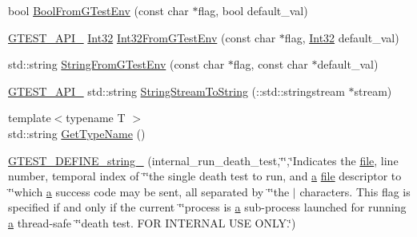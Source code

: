 \begin{DoxyCompactItemize}
\item 
bool \hyperlink{namespacetesting_1_1internal_a67132cdce23fb71b6c38ee34ef81eb4c}{Bool\+From\+G\+Test\+Env} (const char $\ast$flag, bool default\+\_\+val)
\item 
\hyperlink{gtest-port_8h_aa73be6f0ba4a7456180a94904ce17790}{G\+T\+E\+S\+T\+\_\+\+A\+P\+I\+\_\+} \hyperlink{namespacetesting_1_1internal_a8ee38faaf875f133358abaf9bc056cec}{Int32} \hyperlink{namespacetesting_1_1internal_a0f7e728793f9e6cb0aa2b69eaa468bf3}{Int32\+From\+G\+Test\+Env} (const char $\ast$flag, \hyperlink{namespacetesting_1_1internal_a8ee38faaf875f133358abaf9bc056cec}{Int32} default\+\_\+val)
\item 
std\+::string \hyperlink{namespacetesting_1_1internal_ac54dabc540bf79c2de91add679bfb93b}{String\+From\+G\+Test\+Env} (const char $\ast$flag, const char $\ast$default\+\_\+val)
\item 
\hyperlink{gtest-port_8h_aa73be6f0ba4a7456180a94904ce17790}{G\+T\+E\+S\+T\+\_\+\+A\+P\+I\+\_\+} std\+::string \hyperlink{namespacetesting_1_1internal_ac0a2b7f69fc829d80a39e925b6417e39}{String\+Stream\+To\+String} (\+::std\+::stringstream $\ast$stream)
\item 
{\footnotesize template$<$typename T $>$ }\\std\+::string \hyperlink{namespacetesting_1_1internal_a635606b4731f843c86ec8ca51cab83a1}{Get\+Type\+Name} ()
\item 
\hyperlink{namespacetesting_1_1internal_a1b4d550272b7346726a5b4976d5c7aca}{G\+T\+E\+S\+T\+\_\+\+D\+E\+F\+I\+N\+E\+\_\+string\+\_\+} (internal\+\_\+run\+\_\+death\+\_\+test,\char`\"{}\char`\"{},\char`\"{}Indicates the \hyperlink{_07copy_08_2_read_camera_model_8m_a151631b2fd2bb776ef06c9f440a7ed74}{file}, line number, temporal index of \char`\"{}\char`\"{}the single death test to run, and \hyperlink{_07copy_08_2_read_camera_model_8m_a551a3d351eadcc0b9b1a2f24f0fb5ea0}{a} \hyperlink{_07copy_08_2_read_camera_model_8m_a151631b2fd2bb776ef06c9f440a7ed74}{file} descriptor to \char`\"{}\char`\"{}which \hyperlink{_07copy_08_2_read_camera_model_8m_a551a3d351eadcc0b9b1a2f24f0fb5ea0}{a} success code may be sent, all separated by \char`\"{}\char`\"{}the \textquotesingle{}$\vert$\textquotesingle{} characters.  This flag is specified if and only if the current \char`\"{}\char`\"{}process is \hyperlink{_07copy_08_2_read_camera_model_8m_a551a3d351eadcc0b9b1a2f24f0fb5ea0}{a} sub-\/process launched for running \hyperlink{_07copy_08_2_read_camera_model_8m_a551a3d351eadcc0b9b1a2f24f0fb5ea0}{a} thread-\/safe \char`\"{}\char`\"{}death test.  F\+OR I\+N\+T\+E\+R\+N\+AL U\+SE O\+N\+L\+Y.\char`\"{})

\end{DoxyCompactItemize}
